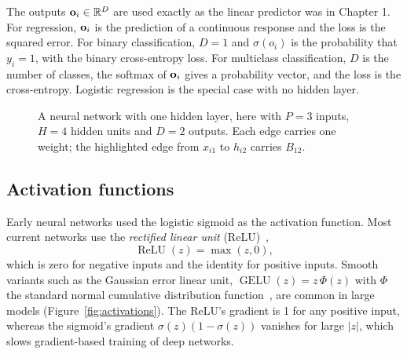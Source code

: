 The outputs $\mathbf{o}_i\in\mathbb{R}^D$ are used exactly as the linear predictor was in Chapter 1. For regression, $\mathbf{o}_i$ is the prediction of a continuous response and the loss is the squared error. For binary classification, $D=1$ and $\sigma(o_i)$ is the probability that $y_i=1$, with the binary cross-entropy loss. For multiclass classification, $D$ is the number of classes, the softmax of $\mathbf{o}_i$ gives a probability vector, and the loss is the cross-entropy. Logistic regression is the special case with no hidden layer.

\begin{figure}[t]
  \centering
  \caption{A neural network with one hidden layer, here with $P=3$ inputs, $H=4$ hidden units and $D=2$ outputs. Each edge carries one weight; the highlighted edge from $x_{i1}$ to $h_{i2}$ carries $B_{12}$.}
  \label{fig:mlp}
\end{figure}

\subsection{Activation functions}

Early neural networks used the logistic sigmoid as the activation function. Most current networks use the \emph{rectified linear unit} (ReLU)~\citep{nair2010},
\begin{equation}
  \operatorname{ReLU}(z) = \max(z,0),
\end{equation}
which is zero for negative inputs and the identity for positive inputs. Smooth variants such as the Gaussian error linear unit, $\operatorname{GELU}(z)=z\,\Phi(z)$ with $\Phi$ the standard normal cumulative distribution function~\citep{hendrycks2016}, are common in large models (Figure~\ref{fig:activations}). The ReLU's gradient is 1 for any positive input, whereas the sigmoid's gradient $\sigma(z)(1-\sigma(z))$ vanishes for large $|z|$, which slows gradient-based training of deep networks.

